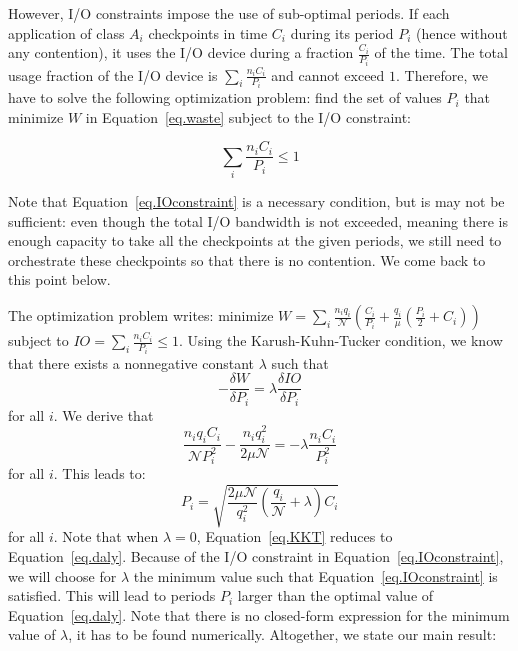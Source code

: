 \documentclass[conference]{IEEEtran}
\newcommand{\nbnodesplat}{{\mathcal N}}
\newcommand{\app}[1]{A_{#1}}
\newcommand{\nbapp}[1]{n_{#1}}
\newcommand{\nbnodes}[1]{q_{#1}}
\newcommand{\period}[1]{P_{#1}}
\newcommand{\ckpt}[1]{C_{#1}}
\newcommand{\mtbfplat}{\mu}
\newcommand{\wasteplat}{W}
\newcommand{\ioconstraint}{\mathit{IO}}
\begin{document}
However, I/O constraints impose the use of sub-optimal periods. If each application
of  class $\app{i}$ checkpoints in time $\ckpt{i}$ during its period $\period{i}$ (hence without any contention), it uses the I/O device during a fraction $\frac{\ckpt{i}}{\period{i}}$ of the time.
The total usage fraction of the  I/O device is $\sum_{i} \frac{\nbapp{i} \ckpt{i}}{\period{i}}$
and cannot exceed $1$. Therefore, we have to solve the following optimization problem: find
the set of values $\period{i}$ that minimize $\wasteplat$ in Equation~\eqref{eq.waste} subject to the I/O constraint:

\begin{equation}
\sum_{i} \frac{\nbapp{i} \ckpt{i}}{\period{i}} \leq 1
\label{eq.IOconstraint}
\end{equation}

Note that Equation~\eqref{eq.IOconstraint} is a necessary condition, but is may not be sufficient:
even though the total I/O bandwidth is not exceeded, meaning there is enough capacity to take all the checkpoints at the given periods, we still need to orchestrate these checkpoints so that there is no contention. We come back to this point below.

The optimization problem writes: minimize $\wasteplat = \sum_i \frac{\nbapp{i} \nbnodes{i}}{\nbnodesplat}  \left( \frac{\ckpt{i}}{\period{i}} +
\frac{\nbnodes{i}}{\mtbfplat}(\frac{\period{i}}{2} + \ckpt{i}) \right)$
subject to $\ioconstraint = \sum_{i} \frac{\nbapp{i} \ckpt{i}}{\period{i}} \leq 1$.
Using the Karush-Kuhn-Tucker condition, we know that there exists a nonnegative constant
$\lambda$
such that
$$- \frac{\delta \wasteplat}{\delta \period{i}} = \lambda \frac{\delta\ioconstraint }{\delta \period{i}}$$
for all $i$. We derive that
$$\frac{\nbapp{i} \nbnodes{i} \ckpt{i}}{\nbnodesplat \period{i}^{2}} -    \frac{\nbapp{i} \nbnodes{i}^{2}}{2 \mtbfplat \nbnodesplat} = - \lambda \frac{\nbapp{i} \ckpt{i}}{\period{i}^{2}}
$$
for all $i$. This leads to:
 \begin{equation}
\period{i} = \sqrt{\frac{2 \mtbfplat  \nbnodesplat}{\nbnodes{i}^{2}} \left(\frac{\nbnodes{i}}{\nbnodesplat} +\lambda \right) \ckpt{i}}
  \label{eq.KKT}
\end{equation}
for all $i$. Note that when $\lambda=0$, Equation~\eqref{eq.KKT} reduces to Equation~\eqref{eq.daly}. Because of the I/O constraint in Equation~\eqref{eq.IOconstraint},
we will choose for $\lambda$ the minimum value such that Equation~\eqref{eq.IOconstraint}
  is satisfied. This will lead to periods $P_{i}$ larger than the optimal value of Equation~\eqref{eq.daly}.
  Note that there is no closed-form expression for the minimum value of $\lambda$,
  it has to be found numerically.
   Altogether, we state our main result:
\end{document}

